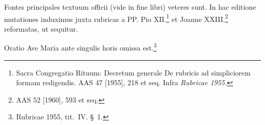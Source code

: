 
\begin{multicols}{2}

Fontes principales textuum officii (vide in fine libri) veteres sunt.
In hac editione mutationes induximus juxta rubricas 
a PP. Pio XII.\footnote{Sacra Congregatio Rituum:
  Decretum generale
  De rubricis ad simpliciorem formam redigendis.
  AAS 47 [1955], 218 et seq.
  Infra \textit{Rubricae 1955.}} 
et Joanne XXIII.\footnote{AAS 52 [1960], 593 et seq.} reformatas,
ut sequitur.

Oratio Ave Maria ante singulis horis omissa est.\footnote{Rubricae 1955, tit.~IV. §~1.}



\end{multicols}
